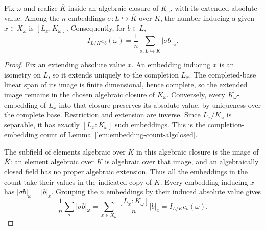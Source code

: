 \begin{lemma}\label{lem:conjugate-count}
\leanok
{}
Fix $\omega$ and realize $\overline K$ inside an algebraic closure of
$K_\omega$, with its extended absolute value. Among the $n$ embeddings
$\sigma:L\hookrightarrow\overline K$ over $K$, the number inducing
a given $x\in X_\omega$ is $[L_x:K_\omega]$. Consequently, for $b\in L$,
\[
 I_{L/K}e_b(\omega)=\frac1n\sum_{\sigma:L\hookrightarrow\overline K}
 |\sigma b|_\omega.
\]
\end{lemma}
\begin{proof}
Fix an extending absolute value $x$. An embedding inducing $x$ is
an isometry on $L$, so it extends uniquely to the completion $L_x$.
The completed-base linear span of its image is finite dimensional,
hence complete, so the extended image remains in the chosen algebraic
closure of $K_\omega$. Conversely, every $K_\omega$-embedding of
$L_x$ into that closure preserves its absolute value, by uniqueness
over the complete base. Restriction and extension are inverse. Since
$L_x/K_\omega$ is separable, it has exactly $[L_x:K_\omega]$ such
embeddings. This is the completion-embedding count of
Lemma~\ref{lem:embedding-count-algclosed}.

The subfield of elements algebraic over $K$ in this algebraic closure
is the image of $\overline K$: an element algebraic over $K$ is
algebraic over that image, and an algebraically closed field has no
proper algebraic extension. Thus all the embeddings in the count
take their values in the indicated copy of $\overline K$.
Every embedding inducing $x$ has $|\sigma b|_\omega=|b|_x$.
Grouping the $n$ embeddings by their induced absolute value gives
\[
 \frac1n\sum_\sigma|\sigma b|_\omega
 =\sum_{x\in X_\omega}\frac{[L_x:K_\omega]}n|b|_x
 =I_{L/K}e_b(\omega).
\]
\end{proof}

